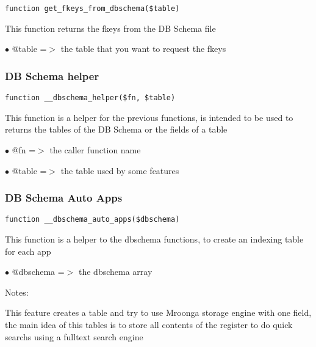 \documentclass[a4paper]{article}
\begin{document}
\begin{lstlisting}
function get_fkeys_from_dbschema($table)
\end{lstlisting}

This function returns the fkeys from the DB Schema file

\begin{compactitem}
\item[\color{myblue}$\bullet$] @table =$>$ the table that you want to request the fkeys
\end{compactitem}

\hypertarget{toc420}{}
\subsubsection{DB Schema helper}

\begin{lstlisting}
function __dbschema_helper($fn, $table)
\end{lstlisting}

This function is a helper for the previous functions, is intended to be used
to returns the tables of the DB Schema or the fields of a table

\begin{compactitem}
\item[\color{myblue}$\bullet$] @fn    =$>$ the caller function name
\item[\color{myblue}$\bullet$] @table =$>$ the table used by some features
\end{compactitem}

\hypertarget{toc421}{}
\subsubsection{DB Schema Auto Apps}

\begin{lstlisting}
function __dbschema_auto_apps($dbschema)
\end{lstlisting}

This function is a helper to the dbschema functions, to create an indexing table for each app

\begin{compactitem}
\item[\color{myblue}$\bullet$] @dbschema =$>$ the dbschema array
\end{compactitem}

Notes:

This feature creates a table and try to use Mroonga storage engine with one field, the main
idea of this tables is to store all contents of the register to do quick searchs using a
fulltext search engine
\end{document}
